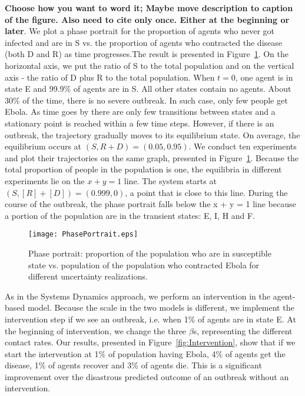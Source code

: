 

\textbf{Choose how you want to word it; Maybe move description to caption of the figure. Also need to cite only once. Either at the beginning or later}.
We plot a phase portrait for the proportion of agents who never got infected and are in S vs. the proportion of agents who contracted the disease (both D and R) as time progresses.The result is presented in Figure~\ref{fig:PhasePortraitABM}. On the horizontal axis, we put the ratio of S to the total population and on the vertical axis - the ratio of D plus R to the total population.  When $t = 0$, one agent is in state E and 99.9\% of agents are in S. All other states contain no agents. About 30\% of the time, there is no severe outbreak. In such case, only few people get Ebola. As time goes by there are only few transitions between states and a stationary point is reached within a few time steps. However, if there is an outbreak, the trajectory gradually moves to its equilibrium state. On average, the equilibrium occurs at $(S, R+ D) = (0.05, 0.95)$. We conduct ten experiments and plot their trajectories on the same graph, presented in Figure~\ref{fig:PhasePortraitABM}. Because the total proportion of people in the population is one, the equilibria in different experiments lie on the $x + y = 1$ line. The system starts at $(S, [R]+[D]) = (0.999, 0)$, a point that is close to this line. During the course of the outbreak, the phase portrait falls below the x + y = 1 line because a portion of the population are in the transient states: E, I, H and F. 

\begin{figure}[h!]
\begin{center}
\texttt{[image: PhasePortrait.eps]}
\end{center}
\caption{Phase portrait: proportion of the population who are in susceptible state vs. population of the population who contracted Ebola for different uncertainty realizations.}
\label{fig:PhasePortraitABM}
\end{figure}


As in the Systems Dynamics approach, we perform an intervention in the agent-based model. Because the scale in the two models is different, we implement the intervention step if we see an outbreak, i.e. when 1\% of agents are in state E. At the beginning of intervention, we change the three $\beta$s, representing the different contact rates. Our results, presented in Figure~\ref{fig:Intervention}, show that if we start the intervention at 1\% of population having Ebola, 4\% of agents get the disease, 1\% of agents recover and 3\% of agents die. This is a significant improvement over the disastrous predicted outcome of an outbreak without an intervention. 

